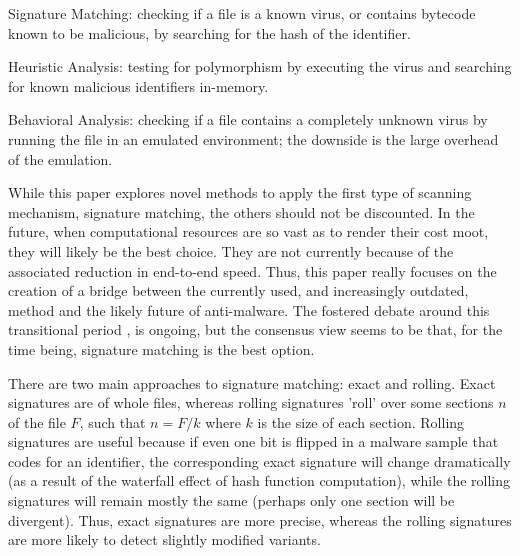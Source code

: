 \documentclass[12pt,journal]{IEEEtran}
\begin{document}
\begin{LaTeXdescription}
  \item[Signature Matching:] checking if a file is a known virus, or contains bytecode known to be malicious, by searching for the hash of the identifier.
  \item[Heuristic Analysis:] testing for polymorphism by executing the virus and searching for known malicious identifiers in-memory.
  \item[Behavioral Analysis:] checking if a file contains a completely unknown virus by running the file in an emulated environment; the downside is the large overhead of the emulation.
\end{LaTeXdescription}
While this paper explores novel methods to apply the first type of scanning mechanism, signature matching, the others should not be discounted. In the future, when computational resources are so vast as to render their cost moot, they will likely be the best choice. They are not currently because of the associated reduction in end-to-end speed. Thus, this paper really focuses on the creation of a bridge between the currently used, and increasingly outdated, method and the likely future of anti-malware. The fostered debate around this transitional period \cite{grossman2007,fitzgerald}, is ongoing, but the consensus view seems to be that, for the time being, signature matching is the best option.\par
There are two main approaches to signature matching: exact and rolling. Exact signatures are of whole files, whereas rolling signatures 'roll' over some sections $n$ of the file $F$, such that $n = F/k$ where $k$ is the size of each section. Rolling signatures are useful because if even one bit is flipped in a malware sample that codes for an identifier, the corresponding exact signature will change dramatically (as a result of the waterfall effect of hash function computation), while the rolling signatures will remain mostly the same (perhaps only one section will be divergent)\cite{Erdogan2005}. Thus, exact signatures are more precise, whereas the rolling signatures are more likely to detect slightly modified variants.  
\end{document}
